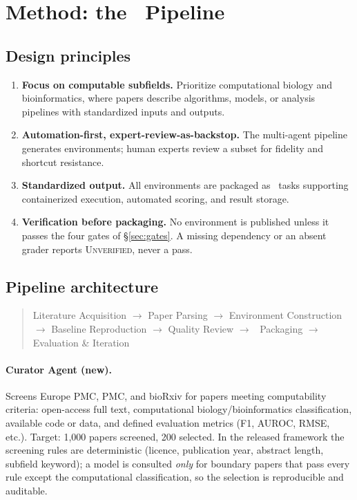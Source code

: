 \section{Method: the \sys\ Pipeline}
\label{sec:method}

\subsection{Design principles}
\label{sec:principles}

\begin{enumerate}
  \item \textbf{Focus on computable subfields.} Prioritize computational biology
        and bioinformatics, where papers describe algorithms, models, or
        analysis pipelines with standardized inputs and outputs.
  \item \textbf{Automation-first, expert-review-as-backstop.} The multi-agent
        pipeline generates environments; human experts review a subset for
        fidelity and shortcut resistance.
  \item \textbf{Standardized output.} All environments are packaged as \harbor\
        tasks supporting containerized execution, automated scoring, and result
        storage.
  \item \textbf{Verification before packaging.} No environment is published
        unless it passes the four gates of \S\ref{sec:gates}. A missing
        dependency or an absent grader reports \textsc{Unverified}, never a pass.
\end{enumerate}

\subsection{Pipeline architecture}
\label{sec:architecture}

\begin{quote}
Literature Acquisition $\rightarrow$ Paper Parsing $\rightarrow$ Environment
Construction $\rightarrow$ Baseline Reproduction $\rightarrow$ Quality Review
$\rightarrow$ \harbor\ Packaging $\rightarrow$ Evaluation \& Iteration
\end{quote}

\paragraph{Curator Agent (new).}
Screens Europe PMC, PMC, and bioRxiv for papers meeting computability criteria:
open-access full text, computational biology/bioinformatics classification,
available code or data, and defined evaluation metrics (F1, AUROC, RMSE, etc.).
Target: 1,000 papers screened, 200 selected. In the released framework the
screening rules are deterministic (licence, publication year, abstract length,
subfield keyword); a model is consulted \emph{only} for boundary papers that
pass every rule except the computational classification, so the selection is
reproducible and auditable.

